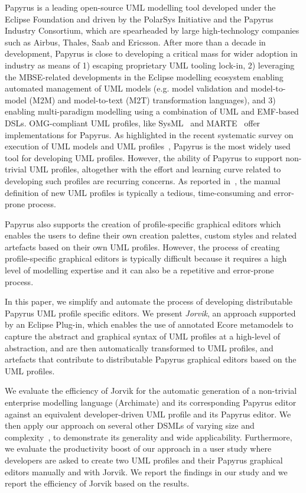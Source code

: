 Papyrus \cite{lanusse2009papyrus} is a leading open-source UML modelling tool developed under the Eclipse Foundation and driven by the PolarSys Initiative and the Papyrus Industry Consortium, which are spearheaded by large high-technology companies such as Airbus, Thales, Saab and Ericsson. 
After more than a decade in development, Papyrus is close to developing a critical mass for wider adoption in industry as means of 1) escaping proprietary UML tooling lock-in, 2) leveraging the MBSE-related developments in the Eclipse modelling ecosystem enabling automated management of UML models (e.g. model validation and model-to-model (M2M) and model-to-text (M2T) transformation languages), and 3) enabling multi-paradigm modelling using a combination of UML and EMF-based DSLs. 
OMG-compliant UML profiles, like SysML~\cite{friedenthal2014practical} and MARTE~\cite{omg2011marte} offer implementations for Papyrus. 
As highlighted in the recent systematic survey on execution of UML models and UML profiles~\cite{ciccozzi2018execution}, Papyrus is the most widely used tool for developing UML profiles.
However, the ability of Papyrus to support non-trivial UML profiles, altogether with the effort and learning curve related to developing such profiles are recurring concerns. 
As reported in~\cite{Wimmer2009:IJWIS}, the manual definition of new UML profiles is typically a tedious, time-consuming and error-prone process.

Papyrus also supports the creation of profile-specific graphical editors which enables the users to define their own creation palettes, custom styles and related artefacts based on their own UML profiles. 
However, the process of creating profile-specific graphical editors is typically difficult because it requires a high level of modelling expertise and it can also be a repetitive and error-prone process.

In this paper, we simplify and automate the process of developing distributable Papyrus UML profile specific editors. 
We present \textit{Jorvik}, an approach supported by an Eclipse Plug-in, which enables the use of annotated Ecore metamodels to capture the abstract and graphical syntax of UML profiles at a high-level of abstraction, and are then automatically transformed to UML profiles, and artefacts that contribute to distributable Papyrus graphical editors based on the UML profiles. 


We evaluate the efficiency of Jorvik for the automatic generation of a non-trivial enterprise modelling language (Archimate) and its corresponding Papyrus editor against an equivalent developer-driven UML profile and its Papyrus editor. 
We then apply our approach on several other DSMLs of varying size and complexity~\cite{williams2013metamodels}, to demonstrate its generality and wide applicability. 
Furthermore, we evaluate the productivity boost of our approach in a user study where developers are asked to create two UML profiles and their Papyrus graphical editors manually and with Jorvik.
We report the findings in our study and we report the efficiency of Jorvik based on the results. 

